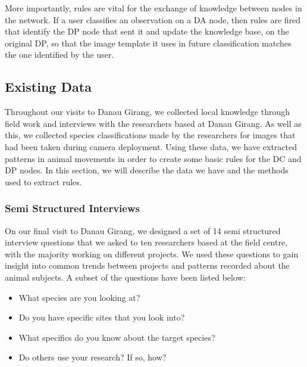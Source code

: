 		More importantly, rules are vital for the exchange of knowledge between nodes in the network. If a user classifies an observation on a DA node, then rules are fired that identify the DP node that sent it and update the knowledge base, on the original DP, so that the image template it uses in future classification matches the one identified by the user.
		
		\subsection{Existing Data}
			Throughout our visits to Danau Girang, we collected local knowledge through field work and interviews with the researchers based at Danau Girang. As well as this, we collected species classifications made by the researchers for images that had been taken during camera deployment. Using these data, we have extracted patterns in animal movements in order to create some basic rules for the DC and DP nodes. In this section, we will describe the data we have and the methods used to extract rules.
			
			\subsubsection{Semi Structured Interviews}
			On our final visit to Danau Girang, we designed a set of 14 semi structured interview questions that we asked to ten researchers based at the field centre, with the majority working on different projects. We used these questions to gain insight into common trends between projects and patterns recorded about the animal subjects. A subset of the questions have been listed below:
			
			\begin{itemize}
				\item What species are you looking at?
				\item Do you have specific sites that you look into?
				\item What specifics do you know about the target species?
				\item Do others use your research? If so, how?
			\end{itemize}
			
